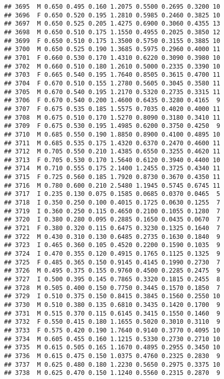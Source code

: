 \documentclass[
]{article}
\begin{document}
\begin{verbatim}
## 3695  M 0.650 0.495 0.160 1.2075 0.5500 0.2695 0.3200 10
## 3696  F 0.650 0.520 0.195 1.2810 0.5985 0.2460 0.3825 10
## 3697  M 0.650 0.525 0.205 1.4275 0.6900 0.3060 0.4355 13
## 3698  M 0.650 0.510 0.175 1.1550 0.4955 0.2025 0.3850 12
## 3699  F 0.650 0.510 0.175 1.3500 0.5750 0.3155 0.3885 10
## 3700  M 0.650 0.525 0.190 1.3685 0.5975 0.2960 0.4000 11
## 3701  F 0.660 0.530 0.170 1.4310 0.6220 0.3090 0.3980 10
## 3702  M 0.660 0.510 0.180 1.2610 0.5000 0.2335 0.3390 10
## 3703  F 0.665 0.540 0.195 1.7640 0.8505 0.3615 0.4700 11
## 3704  F 0.670 0.510 0.155 1.2780 0.5605 0.3045 0.3580 11
## 3705  M 0.670 0.540 0.195 1.2170 0.5320 0.2735 0.3315 11
## 3706  F 0.670 0.540 0.200 1.4600 0.6435 0.3280 0.4165  9
## 3707  F 0.675 0.535 0.185 1.5575 0.7035 0.4020 0.4000 11
## 3708  M 0.675 0.510 0.170 1.5270 0.8090 0.3180 0.3410 11
## 3709  F 0.675 0.530 0.195 1.4985 0.6200 0.3750 0.4250  9
## 3710  M 0.685 0.550 0.190 1.8850 0.8900 0.4100 0.4895 10
## 3711  M 0.685 0.535 0.175 1.4320 0.6370 0.2470 0.4600 11
## 3712  M 0.705 0.550 0.210 1.4385 0.6550 0.3255 0.4620 11
## 3713  F 0.705 0.530 0.170 1.5640 0.6120 0.3940 0.4400 10
## 3714  M 0.710 0.555 0.175 2.1400 1.2455 0.3725 0.4340 11
## 3715  F 0.725 0.560 0.185 1.7920 0.8730 0.3670 0.4350 11
## 3716  M 0.780 0.600 0.210 2.5480 1.1945 0.5745 0.6745 11
## 3717  I 0.235 0.130 0.075 0.1585 0.0685 0.0370 0.0465  5
## 3718  I 0.350 0.250 0.100 0.4015 0.1725 0.0630 0.1255  7
## 3719  I 0.360 0.250 0.115 0.4650 0.2100 0.1055 0.1280  7
## 3720  I 0.380 0.280 0.095 0.2885 0.1650 0.0435 0.0670  7
## 3721  F 0.380 0.320 0.115 0.6475 0.3230 0.1325 0.1640  7
## 3722  M 0.430 0.310 0.130 0.6485 0.2735 0.1630 0.1840  9
## 3723  I 0.465 0.360 0.105 0.4520 0.2200 0.1590 0.1035  9
## 3724  I 0.470 0.355 0.120 0.4915 0.1765 0.1125 0.1325  9
## 3725  F 0.485 0.365 0.150 0.9145 0.4145 0.1990 0.2730  7
## 3726  M 0.495 0.375 0.155 0.9760 0.4500 0.2285 0.2475  9
## 3727  I 0.500 0.395 0.145 0.7865 0.3320 0.1815 0.2455  8
## 3728  M 0.505 0.400 0.150 0.7750 0.3445 0.1570 0.1850  7
## 3729  I 0.510 0.375 0.150 0.8415 0.3845 0.1560 0.2550 10
## 3730  M 0.510 0.380 0.135 0.6810 0.3435 0.1420 0.1700  9
## 3731  M 0.515 0.370 0.115 0.6145 0.3415 0.1550 0.1460  9
## 3732  F 0.550 0.415 0.180 1.1655 0.5020 0.3010 0.3110  9
## 3733  F 0.575 0.420 0.190 1.7640 0.9140 0.3770 0.4095 10
## 3734  M 0.605 0.455 0.160 1.1215 0.5330 0.2730 0.2710 10
## 3735  M 0.615 0.505 0.165 1.1670 0.4895 0.2955 0.3450 10
## 3736  M 0.615 0.475 0.150 1.0375 0.4760 0.2325 0.2830  9
## 3737  M 0.625 0.480 0.180 1.2230 0.5650 0.2975 0.3375 10
## 3738  M 0.625 0.470 0.150 1.1240 0.5560 0.2315 0.2870  9

\end{verbatim}
\end{document}
